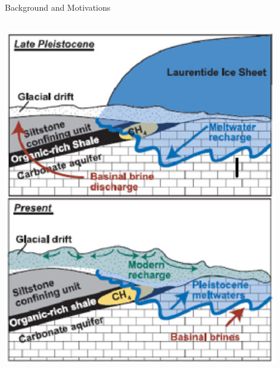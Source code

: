 \documentclass{beamer}
\begin{document}
\begin{frame}{Background and Motivations}
\begin{columns}
\begin{column}{0.35\textwidth}
\includegraphics[width=0.9\textwidth]{figure/intro2}
\end{column}
\end{columns}
\end{frame}
\end{document}
